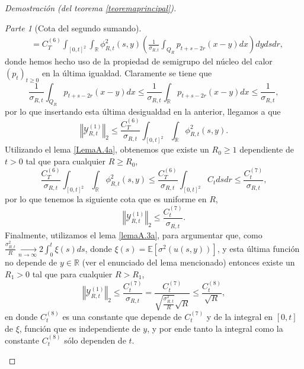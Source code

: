 \documentclass[letterpaper,twoside,12pt]{book}
\newcommand{\R}{\mathbb{R}}
\newcommand{\E}{\mathbb{E}}
\newcommand{\1}{\mathds{1}}
\renewcommand{\to}{\rightarrow}
\newcommand{\norm}[1]{\left\Vert #1 \right\Vert}
\theoremstyle{definition}
\theoremstyle{definition}
\theoremstyle{remark}
\newtheorem{proofpart}{Parte}
\theoremstyle{definition}
\theoremstyle{definition}
\theoremstyle{definition}
\theoremstyle{definition}
\theoremstyle{definition}
\begin{document}
\begin{proof}[Demostración (del teorema \ref{teoremaprincipal})]
\begin{proofpart}[Cota del segundo sumando]
\begin{align*}
   &=C^{(6)}_T\int_{[0,t]^2}\int_{\R}\phi_{R,t}^2(s,y)\left(\frac{1}{\sigma_{R,t}}\int_{Q_R}p_{t+s-2r}(x-y)dx\right)dy ds dr,
\end{align*}
donde hemos hecho uso de la propiedad de semigrupo del núcleo del calor $(p_t)_{t\geq0}$ en la última igualdad. Claramente se tiene que 
\[
   \frac{1}{\sigma_{R,t}}\int_{Q_R}p_{t+s-2r}(x-y)dx\leq \frac{1}{\sigma_{R,t}}\int_{\R}p_{t+s-2r}(x-y)dx\leq \frac{1}{\sigma_{R,t}},
\]
por lo que insertando esta última desigualdad en la anterior, llegamos a que 
\[
\norm{\mathcal{Y}_{R,t}^{(1)}}_2\leq \frac{C_T^{(6)}}{\sigma_{R,t}}\int_{[0,t]^2}\int_{\R}\phi_{R,t}^2(s,y).
\]
Utilizando el lema \ref{LemaA.4a}, obtenemos que existe un $R_0\geq1$ dependiente de $t>0$ tal que para cualquier $R\geq R_0$,
\[
   \frac{C_T^{(6)}}{\sigma_{R,t}}\int_{[0,t]^2}\int_{\R}\phi_{R,t}^2(s,y)\leq \frac{C_T^{(6)}}{\sigma_{R,t}}\int_{[0,t]^2}C_t ds dr\leq \frac{C_t^{(7)}}{\sigma_{R,t}},
\]
por lo que tenemos la siguiente cota que es uniforme en $R$,
\[
\norm{\mathcal{Y}_{R,t}^{(1)}}_2\leq \frac{C_t^{(7)}}{\sigma_{R,t}}.
\]
Finalmente, utilizamos el lema \ref{lemaA.3a}, para argumentar que, como $\tfrac{\sigma^2_{R,t}}{R} \xrightarrow[n\to\infty]{}2\int_{0}^{t}\xi(s)ds$, donde $\xi(s)=\E\left[\sigma^2(u(s,y))\right]$, y esta última función no depende de $y\in \R$ (ver el enunciado del lema mencionado) entonces existe un $R_1>0$ tal que para cualquier $R>R_1$,
\begin{equation}\label{cotafinal1}
      \norm{\mathcal{Y}_{R,t}^{(1)}}_2\leq \frac{C_t^{(7)}}{\sigma_{R,t}}=\frac{C_t^{(7)}}{\sqrt{\frac{\sigma_{R,t}^2}{R}}\sqrt{R}}\leq \frac{C_t^{(8)}}{\sqrt{R}},  
\end{equation}
en donde $C_t^{(8)}$ es una constante que depende de $C_t^{(7)}$ y de la integral en $[0,t]$ de $\xi$, función que es independiente de $y$, y por ende tanto la integral como la constante $C_t^{(8)}$ sólo dependen de $t$.


\end{proofpart}
\end{proof}
\end{document}
